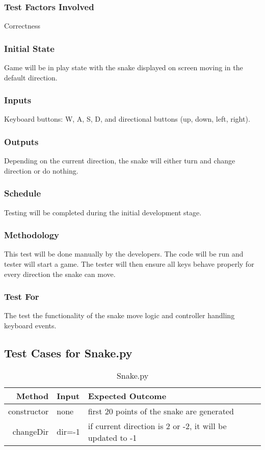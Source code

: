 \documentclass[12pt]{article}
\begin{document}
\subsubsection*{Test Factors Involved}
Correctness
\subsubsection*{Initial State}
Game will be in play state with the snake displayed on screen moving in the default direction.
\subsubsection*{Inputs}
Keyboard buttons: W, A, S, D, and directional buttons (up, down, left, right). 
\subsubsection*{Outputs}
Depending on the current direction, the snake will either turn and change direction or do nothing.
\subsubsection*{Schedule}
Testing will be completed during the initial development stage.
\subsubsection*{Methodology}
This test will be done manually by the developers. The code will be run and tester will start a game. The tester will then ensure all keys behave properly for every direction the snake can move.
\subsubsection*{Test For}
The test the functionality of the snake move logic and controller handling keyboard events.\newline


\subsection{Test Cases for Snake.py}

\begin{center}
	\begin{longtable}{ | r | p{4cm} | p{4cm} | p{4cm} |}
	\caption{Snake.py} \\ \hline \label{TblInputVar} 
	Method & Input & Expected Outcome\\ \hline
	constructor & none &  first 20 points of the snake are generated\\ \hline
	changeDir & dir=-1 & if current direction is 2 or -2, it will be updated to -1\\ \hline
	\end{longtable}
\end{center}
\end{document}
